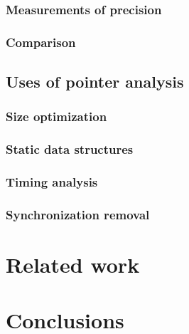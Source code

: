 \documentclass[twoside]{article}
\begin{document}
\subsubsection{Measurements of precision}
\subsubsection{Comparison}
\subsection{Uses of pointer analysis}
\subsubsection{Size optimization}
\subsubsection{Static data structures}
\subsubsection{Timing analysis}
\subsubsection{Synchronization removal}
\section{Related work}
\section{Conclusions}
\end{document}
